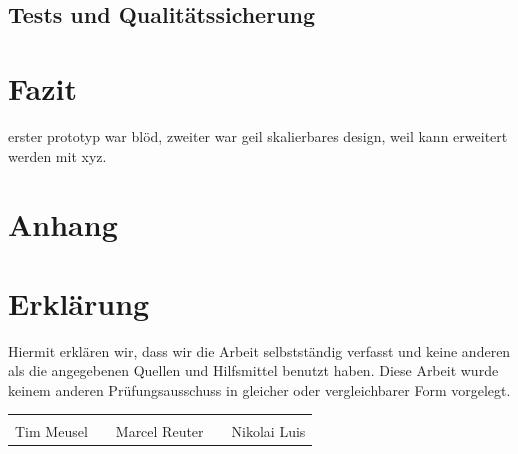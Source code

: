 \section{Tests und Qualitätssicherung}

\chapter{Fazit}
erster prototyp war blöd, zweiter war geil
skalierbares design, weil
kann erweitert werden mit xyz.

\appendix

\printglossaries%

\printbibliography[heading=bibnumbered]

\chapter{Anhang}







\chapter{Erklärung}
Hiermit erklären wir, dass wir die Arbeit selbstständig verfasst und keine
anderen als die angegebenen Quellen und Hilfsmittel benutzt haben. Diese Arbeit
wurde keinem anderen Prüfungsausschuss in gleicher oder vergleichbarer Form
vorgelegt.

\vfill
{\centering
\renewcommand{\arraystretch}{0.9}
\begin{tabular}{p{}p{}p{}p{}p{}}
  \dotfill                    & & \dotfill                      & & \dotfill \\
  \centering\footnotesize{Tim Meusel}& & \centering\footnotesize{Marcel Reuter}& & \centering\footnotesize{Nikolai Luis}%
\end{tabular}
}

